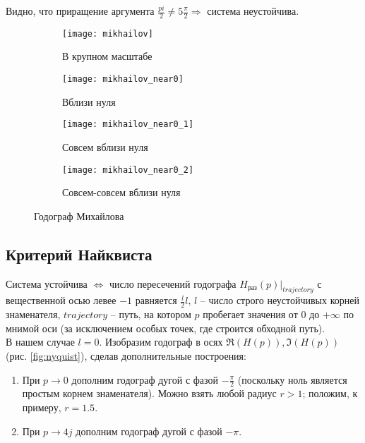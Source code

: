 \documentclass[a4paper,12pt]{article}
\newcommand{\myPictWidth}{.95\textwidth}
\begin{document}
Видно, что приращение аргумента $ \frac{pi}{2} \ne 5 \frac{\pi}{2} \Rightarrow $ система неустойчива.

\begin{figure}[H]
    \centering
    \begin{subfigure}{.5\textwidth}
        \centering
        \texttt{[image: mikhailov]}
        \caption{В крупном масштабе}
    \end{subfigure}%
    \begin{subfigure}{.5\textwidth}
        \centering
        \texttt{[image: mikhailov\_near0]}
        \caption{Вблизи нуля}
    \end{subfigure}

    \begin{subfigure}{.5\textwidth}
        \centering
        \texttt{[image: mikhailov\_near0\_1]}
        \caption{Совсем вблизи нуля}
    \end{subfigure}%
    \begin{subfigure}{.5\textwidth}
        \centering
        \texttt{[image: mikhailov\_near0\_2]}
        \caption{Совсем-совсем вблизи нуля}
    \end{subfigure}
    \caption{Годограф Михайлова}
    \label{fig:mikhailov}
\end{figure}

\subsection{ Критерий Найквиста }

Система устойчива $ \Leftrightarrow $ число пересечений годографа $ H_{\text{раз}}(p)|_{trajectory} $ с вещественной осью левее $ -1 $ равняется $ \frac{l}{2} l $, $ l $ -- число строго неустойчивых корней знаменателя, $ trajectory $ -- путь, на котором $ p $ пробегает значения от $ 0 $ до $ + \infty $ по мнимой оси (за исключением особых точек, где строится обходной путь). \\

В нашем случае $ l = 0 $.
Изобразим годограф в осях  $ \Re(H(p)), \Im(H(p)) $ (рис. \ref{fig:nyquist}), сделав дополнительные построения:
\begin{enumerate}[noitemsep]
    \item При $ p \to 0 $ дополним годограф дугой с фазой $ - \frac{\pi}{2} $ (поскольку ноль является простым корнем знаменателя).
    Можно взять любой радиус $ r > 1 $; положим, к примеру, $ r = 1.5 $.
    \item При $ p \to 4j $ дополним годограф дугой с фазой $ - \pi $.
\end{enumerate}
\end{document}
